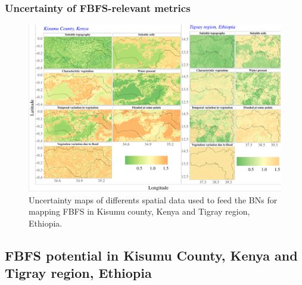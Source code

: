 \documentclass[]{elsarticle} %
\begin{document}
\hypertarget{section_3_2_3}{%
\subsubsection{Uncertainty of FBFS-relevant metrics}\label{section_3_2_3}}

\begin{figure}[!h]

{\centering \includegraphics[width=1\linewidth,]{figures/uncertainty_plot} 

}

\caption{Uncertainty maps of differents spatial data used to feed the BNs for mapping FBFS in Kisumu county, Kenya and Tigray region, Ethiopia.}\label{fig:fig8}
\end{figure}

\hypertarget{section_3_3}{%
\subsection{FBFS potential in Kisumu County, Kenya and Tigray region, Ethiopia}\label{section_3_3}}
\end{document}
